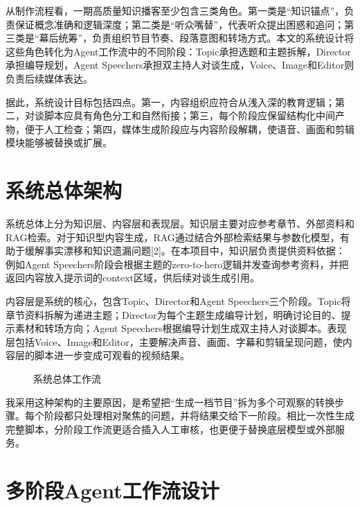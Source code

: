 \documentclass{rjthesis}
\begin{document}
从制作流程看，一期高质量知识播客至少包含三类角色。第一类是“知识锚点”，负责保证概念准确和逻辑深度；第二类是“听众嘴替”，代表听众提出困惑和追问；第三类是“幕后统筹”，负责组织节目节奏、段落意图和转场方式。本文的系统设计将这些角色转化为Agent工作流中的不同阶段：Topic承担选题和主题拆解，Director承担编导规划，Agent Speechers承担双主持人对谈生成，Voice、Image和Editor则负责后续媒体表达。

据此，系统设计目标包括四点。第一，内容组织应符合从浅入深的教育逻辑；第二，对谈脚本应具有角色分工和自然衔接；第三，每个阶段应保留结构化中间产物，便于人工检查；第四，媒体生成阶段应与内容阶段解耦，使语音、画面和剪辑模块能够被替换或扩展。

\section{系统总体架构}

系统总体上分为知识层、内容层和表现层。知识层主要对应参考章节、外部资料和RAG检索。对于知识型内容生成，RAG通过结合外部检索结果与参数化模型，有助于缓解事实漂移和知识遗漏问题[2]。在本项目中，知识层负责提供资料依据：例如Agent Speechers阶段会根据主题的zero-to-hero逻辑并发查询参考资料，并把返回内容放入提示词的context区域，供后续对谈生成引用。

内容层是系统的核心，包含Topic、Director和Agent Speechers三个阶段。Topic将章节资料拆解为递进主题；Director为每个主题生成编导计划，明确讨论目的、提示素材和转场方向；Agent Speechers根据编导计划生成双主持人对谈脚本。表现层包括Voice、Image和Editor，主要解决声音、画面、字幕和剪辑呈现问题，使内容层的脚本进一步变成可观看的视频结果。

\begin{figure}[htbp]
\centering
{}
\caption{系统总体工作流}
\end{figure}

我采用这种架构的主要原因，是希望把“生成一档节目”拆为多个可观察的转换步骤。每个阶段都只处理相对聚焦的问题，并将结果交给下一阶段。相比一次性生成完整脚本，分阶段工作流更适合插入人工审核，也更便于替换底层模型或外部服务。

\section{多阶段Agent工作流设计}
\end{document}

